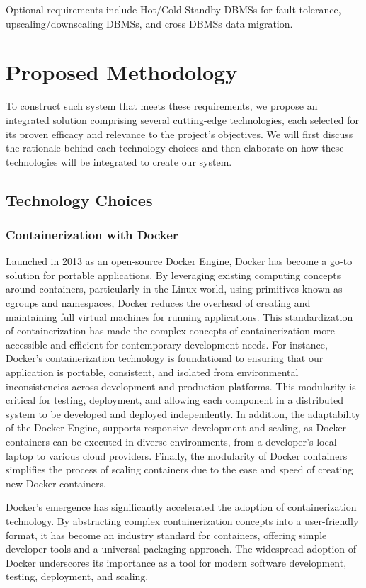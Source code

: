 \documentclass{report}
\begin{document}
    Optional requirements include Hot/Cold Standby DBMSs for fault tolerance, upscaling/downscaling DBMSs, and cross DBMSs data migration.

    \section{Proposed Methodology}
    To construct such system that meets these requirements, we propose an integrated solution comprising several cutting-edge technologies, each selected for its proven efficacy and relevance to the project's objectives. We will first discuss the rationale behind each technology choices and then elaborate on how these technologies will be integrated to create our system.

    \subsection{Technology Choices}

    \subsubsection{Containerization with Docker}
    Launched in 2013 as an open-source Docker Engine, Docker has become a go-to solution for portable applications. By leveraging existing computing concepts around containers, particularly in the Linux world, using primitives known as cgroups and namespaces, Docker reduces the overhead of creating and maintaining full virtual machines for running applications. This standardization of containerization has made the complex concepts of containerization more accessible and efficient for contemporary development needs. For instance, Docker's containerization technology is foundational to ensuring that our application is portable, consistent, and isolated from environmental inconsistencies across development and production platforms. This modularity is critical for testing, deployment, and allowing each component in a distributed system to be developed and deployed independently. In addition, the adaptability of the Docker Engine, supports responsive development and scaling, as Docker containers can be executed in diverse environments, from a developer's local laptop to various cloud providers. Finally, the modularity of Docker containers simplifies the process of scaling containers due to the ease and speed of creating new Docker containers.

    Docker's emergence has significantly accelerated the adoption of containerization technology. By abstracting complex containerization concepts into a user-friendly format, it has become an industry standard for containers, offering simple developer tools and a universal packaging approach. The widespread adoption of Docker underscores its importance as a tool for modern software development, testing, deployment, and scaling.
\end{document}

